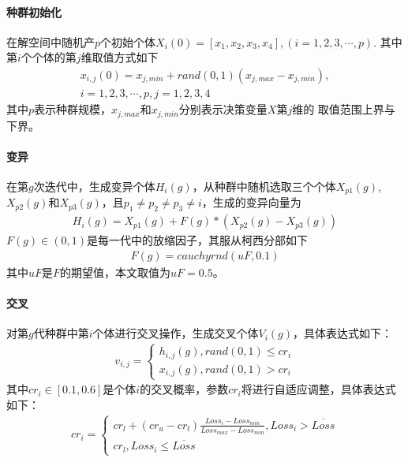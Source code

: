 \documentclass{whutmod}
\begin{document}
		\paragraph{种群初始化}
		在解空间中随机产$p$个初始个体$
		X_i(0)=[x_1,x_2,x_3,x_4],(i=1,2,3,\cdots,p).
		$
		其中第$i$个个体的第$j$维取值方式如下
		\begin{gather}
		x_{i,j}(0)=x_{j,min}+rand(0,1)(x_{j,max}-x_{j,min}),\\i=1,2,3,\cdots,p,j=1,2,3,4
		\end{gather}
		其中$p$表示种群规模，$x_{j,max}$和$x_{j,min}$分别表示决策变量$X$第$j$维的
		取值范围上界与下界。
		\paragraph{变异}
		在第$g$次迭代中，生成变异个体$H_i(g)$，从种群中随机选取三个个体$X_{p1}(g)$,$X_{p2}(g)$和$X_{p3}(g)$，且$p_1\neq p_2\neq p_3\neq i$，生成的变异向量为
	    \begin{gather}
	    H_i(g)=X_{p1}(g)+F(g)*(X_{p2}(g)-X_{p3}(g))
	    \end{gather}
	    $F(g)\in (0,1)$是每一代中的放缩因子，其服从柯西分部如下
	    \begin{gather}
	    F(g)=cauchyrnd(uF,0.1)
	    \end{gather}
	   其中$uF$是$F$的期望值，本文取值为$uF=0.5$。
		\paragraph{交叉}
		对第$g$代种群中第$i$个体进行交叉操作，生成交叉个体$V_i(g)$，具体表达式如下：
		\begin{gather}
		v_{i,j}=\left\{\begin{matrix}h_{i,j}(g),rand(0,1)\leq cr_{i}
		\\ x_{i,j}(g),rand(0,1)>cr_{i}
		\end{matrix}\right.
		\end{gather}
     	其中$cr_{i}\in[0.1,0.6]$是个体$i$的交叉概率，参数$cr_{i}$将进行自适应调整，具体表达式如下：
		\begin{gather}
		cr_{i}=\left\{\begin{matrix}cr_{l}+(cr_{u}-cr_{l})\frac{Loss_{i}-Loss_{min}}{Loss_{max}-Loss_{min}} , Loss_{i}>\overline{Loss}
		\\ cr_{l},Loss_{i}\leqslant  \overline{Loss}
		\end{matrix}\right.
		\end{gather}
\end{document}
